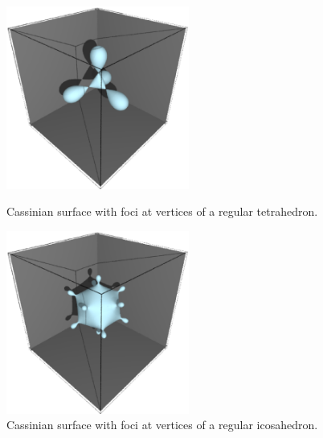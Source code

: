 \documentclass{article}
\begin{document}
\begin{figure}[H]
\begin{minipage}{.5\hsize}
\begin{center}
\includegraphics[width=6cm]{images/tetrahedral_cassini.eps}
\caption{Cassinian surface with foci at vertices of a regular tetrahedron.}
\label{}
\end{center}
\end{minipage}
\begin{minipage}{0.5\hsize}
\begin{center}
\includegraphics[width=6cm]{images/icosahedral_cassini.eps}
\caption{Cassinian surface with foci at vertices of a regular icosahedron.}
\label{}
\end{center}
\end{minipage}
\end{figure}
\end{document}

